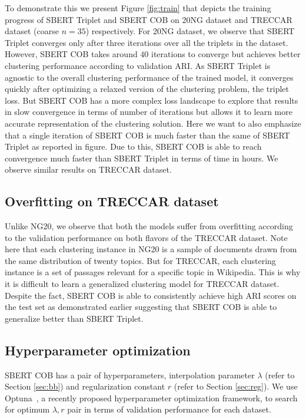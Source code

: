 \documentclass[11pt,a4paper]{article}
\begin{document}
To demonstrate this we present Figure \ref{fig:train} that depicts the training progress of SBERT Triplet and SBERT COB on 20NG dataset and TRECCAR dataset (coarse $n=35$) respectively. For 20NG dataset, we observe that SBERT Triplet converges only after three iterations over all the triplets in the dataset. However, SBERT COB takes around $40$ iterations to converge but achieves better clustering performance according to validation ARI. As SBERT Triplet is agnostic to the overall clustering performance of the trained model, it converges quickly after optimizing a relaxed version of the clustering problem, the triplet loss. But SBERT COB has a more complex loss landscape to explore that results in slow convergence in terms of number of iterations but allows it to learn more accurate representation of the clustering solution. Here we want to also emphasize that a single iteration of SBERT COB is much faster than the same of SBERT Triplet as reported in figure. Due to this, SBERT COB is able to reach convergence much faster than SBERT Triplet in terms of time in hours. We observe similar results on TRECCAR dataset.

\subsection{Overfitting on TRECCAR dataset} Unlike NG20, we observe that both the models suffer from overfitting according to the validation performance on both flavors of the TRECCAR dataset. Note here that each clustering instance in NG20 is a sample of documents drawn from the same distribution of twenty topics. But for TRECCAR, each clustering instance is a set of passages relevant for a specific topic in Wikipedia. This is why it is difficult to learn a generalized clustering model for TRECCAR dataset. Despite the fact, SBERT COB is able to consistently achieve high ARI scores on the test set as demonstrated earlier suggesting that SBERT COB is able to generalize better than SBERT Triplet.

\subsection{Hyperparameter optimization} SBERT COB has a pair of hyperparameters, interpolation parameter $\lambda$ (refer to Section \ref{sec:bb}) and regularization constant $r$ (refer to Section \ref{sec:reg}). We use Optuna~\cite{optuna_2019}, a recently proposed hyperparameter optimization framework, to search for optimum $\lambda, r$ pair in terms of validation performance for each dataset.
\end{document}
